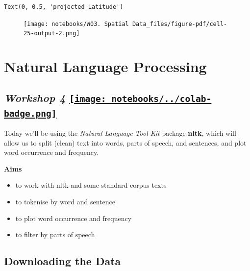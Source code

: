 \documentclass[
  letterpaper,
  DIV=11,
  numbers=noendperiod]{scrreprt}
\providecommand{\tightlist}{%
  \setlength{\itemsep}{0pt}\setlength{\parskip}{0pt}}\usepackage{longtable,booktabs,array}
\begin{document}
\begin{verbatim}
Text(0, 0.5, 'projected Latitude')
\end{verbatim}

\begin{figure}[H]

{\centering \texttt{[image: notebooks/W03. Spatial Data\_files/figure-pdf/cell-25-output-2.png]}

}

\end{figure}


\hypertarget{natural-language-processing}{%
\chapter{Natural Language
Processing}\label{natural-language-processing}}

\hypertarget{workshop-4-open-in-colab}{%
\section[\emph{Workshop 4} ]{\texorpdfstring{\emph{Workshop 4}
\href{https://colab.research.google.com/github/oballinger/QM2/blob/main/notebooks/W04.\%20Natural\%20Language\%20Processing.ipynb}{\protect\texttt{[image: notebooks/../colab-badge.png]}}}{Workshop 4 Open In Colab}}\label{workshop-4-open-in-colab}}

Today we'll be using the \emph{Natural Language Tool Kit} package
\textbf{nltk}, which will allow us to split (clean) text into words,
parts of speech, and sentences, and plot word occurrence and frequency.

\textbf{Aims}

\begin{itemize}
\tightlist
\item
  to work with nltk and some standard corpus texts
\item
  to tokenise by word and sentence
\item
  to plot word occurrence and frequency
\item
  to filter by parts of speech
\end{itemize}

\hypertarget{downloading-the-data-2}{%
\section{Downloading the Data}\label{downloading-the-data-2}}
\end{document}
